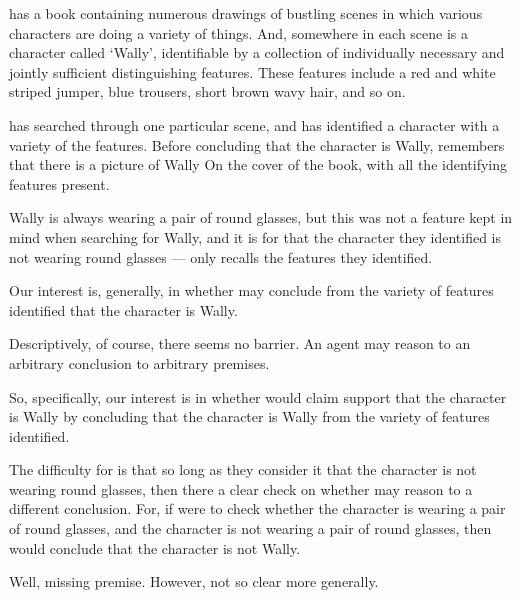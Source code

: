 \begin{note}[Wally]
  \begin{illustration}
    \label{illu:CS:wheres-wally}
     has a book containing numerous drawings of bustling scenes in which various characters are doing a variety of things.
    And, somewhere in each scene is a character called `Wally', identifiable by a collection of individually necessary and jointly sufficient distinguishing features.
    These features include a red and white striped jumper, blue trousers, short brown wavy hair, and so on.

     has searched through one particular scene, and has identified a character with a variety of the features.
    Before concluding that the character is Wally,  remembers that there is a picture of Wally On the cover of the book, with all the identifying features present.

    Wally is always wearing a pair of round glasses, but this was not a feature  kept in mind when searching for Wally, and it is \epVAd{} for  that the character they identified is not wearing round glasses  ---  only recalls the features they identified.
  \end{illustration}

  Our interest is, generally, in whether  may conclude from the variety of features identified that the character is Wally.

  Descriptively, of course, there seems no barrier.
  An agent may reason to an arbitrary conclusion to arbitrary premises.

  So, specifically, our interest is in whether  would claim support that the character is Wally by concluding that the character is Wally from the variety of features identified.

  The difficulty for  is that so long as they consider it \epVAd{} that the character is not wearing round glasses, then there a clear check on whether  may reason to a different conclusion.
  For, if  were to check whether the character is wearing a pair of round glasses, and the character is not wearing a pair of round glasses, then  would conclude that the character is not Wally.
\end{note}

\begin{note}
  Well, missing premise.
  However, not so clear more generally.
\end{note}

